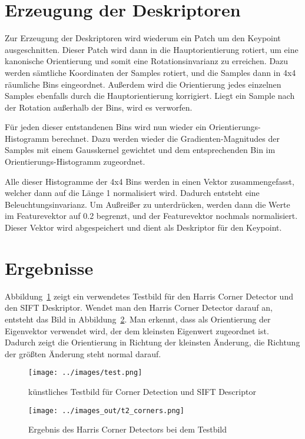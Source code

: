 \section{Erzeugung der Deskriptoren}

Zur Erzeugung der Deskriptoren wird wiederum ein Patch um den Keypoint ausgeschnitten. Dieser Patch wird dann in die Hauptorientierung rotiert, um eine kanonische Orientierung und somit eine Rotationsinvarianz zu erreichen. Dazu werden sämtliche Koordinaten der Samples rotiert, und die Samples dann in 4x4 räumliche Bins eingeordnet. Außerdem wird die Orientierung jedes einzelnen Samples ebenfalls durch die Hauptorientierung korrigiert. Liegt ein Sample nach der Rotation außerhalb der Bins, wird es verworfen.

Für jeden dieser entstandenen Bins wird nun wieder ein Orientierungs-Histogramm berechnet. Dazu werden wieder die Gradienten-Magnitudes der Samples mit einem Gausskernel gewichtet und dem entsprechenden Bin im Orientierungs-Histogramm zugeordnet.

Alle dieser Histogramme der 4x4 Bins werden in einen Vektor zusammengefasst, welcher dann auf die Länge 1 normalisiert wird. Dadurch entsteht eine Beleuchtungsinvarianz. Um Außreißer zu unterdrücken, werden dann die Werte im Featurevektor auf 0.2 begrenzt, und der Featurevektor nochmals normalisiert. Dieser Vektor wird abgespeichert und dient als Deskriptor für den Keypoint.


\section{Ergebnisse}

Abbildung~\ref{fig:test} zeigt ein verwendetes Testbild für den Harris Corner Detector und den SIFT Deskriptor. Wendet man den Harris Corner Detector darauf an, entsteht das Bild in Abbildung~\ref{fig:t2_corners}. Man erkennt, dass als Orientierung der Eigenvektor verwendet wird, der dem kleinsten Eigenwert zugeordnet ist. Dadurch zeigt die Orientierung in Richtung der kleinsten Änderung, die Richtung der größten Änderung steht normal darauf.

\begin{figure}[htb]
 \centering
 \texttt{[image: ../images/test.png]}
 \caption{künstliches Testbild für Corner Detection und SIFT Descriptor}
 \label{fig:test}
\end{figure}

\begin{figure}[htb]
 \centering
 \texttt{[image: ../images\_out/t2\_corners.png]}
 \caption{Ergebnis des Harris Corner Detectors bei dem Testbild}
 \label{fig:t2_corners}
\end{figure}

